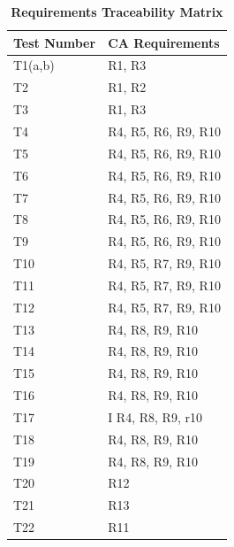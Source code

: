 \documentclass[12pt, titlepage]{article}
\begin{document}
\begin{table} 
	\caption{\textbf{Requirements Traceability Matrix}}
	\label{Table:Table_TraceabilityR}  
	\begin{tabular}{|p{4cm}|p{4cm}|}
		\hline	
		\textbf{Test Number}  & \textbf{CA Requirements}\\
		\hline 
		T1(a,b)&   R1, R3       \\ \hline
		T2&  R1, R2       \\ \hline
		T3&   R1, R3       \\ \hline
		
		T4&  R4, R5, R6, R9, R10   \\ \hline
		T5&  R4, R5, R6, R9, R10   \\ \hline
		
		T6&  R4, R5, R6, R9, R10   \\ \hline
		T7&  R4, R5, R6, R9, R10   \\ \hline
		
		T8&  R4, R5, R6, R9, R10   \\ \hline
		T9&  R4, R5, R6, R9, R10   \\ \hline
		
		
		T10&  R4, R5, R7, R9, R10     \\ \hline
		T11&  R4, R5, R7, R9, R10     \\ \hline
		
		
		T12&  R4, R5, R7, R9, R10     \\ \hline
		
		
		T13&  R4, R8, R9, R10  \\ \hline
		T14&  R4, R8, R9, R10  \\ \hline
		T15&  R4, R8, R9, R10  \\ \hline
		
		
		T16&  R4, R8, R9, R10    \\ \hline
		T17& I R4, R8, R9, r10     \\ \hline
		
		T18&  R4, R8, R9, R10    \\ \hline
		T19&  R4, R8, R9, R10    \\ \hline
		
		T20&   R12\\ \hline
		T21&   R13\\ \hline
		T22&   R11\\ \hline
		
	\end{tabular}\\
\end{table}
\end{document}
